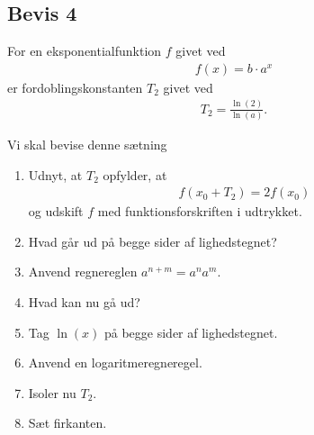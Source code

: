 \subsection*{Bevis 4}
\begin{setn}
	For en eksponentialfunktion $f$ givet ved
	\begin{align*}
		f(x) = b\cdot a^x
	\end{align*}
	er fordoblingskonstanten $T_2$ givet ved
	\begin{align*}
		T_2 = \frac{\ln(2)}{\ln(a)}.
	\end{align*}
\end{setn}
Vi skal bevise denne sætning
\begin{enumerate}[label=\roman*)]
	\item Udnyt, at $T_2$ opfylder, at 
	\begin{align*}
		f(x_0 + T_2) = 2f(x_0)
	\end{align*}
	og udskift $f$ med funktionsforskriften i udtrykket.
	\item Hvad går ud på begge sider af lighedstegnet?
	\item Anvend regnereglen $a^{n+m} = a^na^m$.
	\item Hvad kan nu gå ud?
	\item Tag $\ln(x)$ på begge sider af lighedstegnet.
	\item Anvend en logaritmeregneregel.
	\item Isoler nu $T_2$.
	\item Sæt firkanten.
\end{enumerate}
